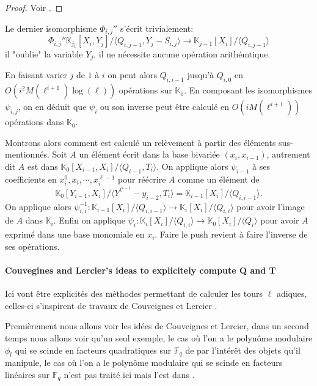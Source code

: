 \documentclass[10pt,a4paper]{book}
\theoremstyle{plain}
\theoremstyle{definition}
\theoremstyle{definition}
\theoremstyle{definition}
\theoremstyle{definition}
\theoremstyle{remark}
\theoremstyle{remark}
\begin{document}
\begin{proof}
Voir \cite{DeFeo-Doliskani-Schost13}.
\end{proof}

Le dernier isomorphisme $\Phi_{i,j}''$ s'écrit trivialement:
\begin{equation*}
\Phi_{i,j}'' \mathbb{K}_{j_1}[X_i,Y_j]/\langle Q_{i,j-1}, Y_j-S_{i,j}\rangle \to \mathbb{K}_{j-1}[X_i]/\langle Q_{i,j-1} \rangle 
\end{equation*}
il "oublie" la variable $Y_j$, il ne nécessite aucune opération arithémtique.

En faisant varier $j$ de $1$ à $i$ on peut alors $Q_{i,i-1}$ jusqu'à $Q_{i,0}$ en $O(i^2M(\ell^{i+1})\log(\ell))$ opérations sur $\mathbb{K}_0$. En composant les isomorphismes $\psi_{i,j}$, on en déduit que $\psi_i$ ou son inverse peut être calculé en $O(iM(\ell^{i+1}))$ opérations dans $\mathbb{K}_0$.

Montrons alors comment est calculé un relèvement à partir des éléments sus-mentionnés. Soit $A$ un élément écrit dans la base bivariée $(x_i,x_{i-1})$, autrement dit $A$ est dans $\mathbb{K}_0[X_{i-1},X_i]/\langle Q_{i-1}, T_{i} \rangle$. On applique alors $\psi_{i-1}$ à ses coefficients en $x_i^0,x_i,\cdots, x_i^{\ell-1}$ pour réécrire $A$ comme un élément de
\begin{equation*}
\mathbb{K}_0[Y_{i-1},X_i]/\langle Y^{\ell^{i-1}}-y_{i-2},T_i \rangle = \mathbb{K}_{i-1}[X_i]/\langle Q_{i,i-1} \rangle.
\end{equation*}
On applique alors $\psi_{i,i}^{-1}:\mathbb{K}_{i-1}[X_i]/\langle Q_{i,i-1} \rangle \to \mathbb{K}_i[X_i]/\langle Q_{i,i} \rangle$ pour avoir l'image de $A$ dans $\mathbb{K}_i$. Enfin on applique $\psi_{i}:\mathbb{K}_i[X_i]/\langle Q_{i,i} \rangle \to \mathbb{K}_0[X_i]/ \langle Q_i \rangle $ pour avoir $A$ exprimé dans une base monomiale en $x_i$. Faire le push revient à faire l'inverse de ses opérations.

\paragraph{Couvegines and Lercier's ideas to explicitely compute Q and T}
Ici vont être explicités des méthodes permettant de calculer les tours $\ell$ adiques, celles-ci s'inspirent de travaux de Couveignes et Lercier \cite{couveignesLercier2013}.

Premièrement nous allons voir les idées de Couveignes et Lercier, dans un second temps nous allons voir qu'un seul exemple, le cas où l'on a le polynôme modulaire $\phi_l$ qui se scinde en facteurs quadratiques sur $\mathbb{F}_q$ de par l'intérêt des objets qu'il manipule, le cas où l'on a le polynôme modulaire qui se scinde en facteurs linéaires sur $\mathbb{F}_q$ n'est pas traité ici mais l'est dans \cite{DeFeo-Doliskani-Schost13}.
\end{document}
